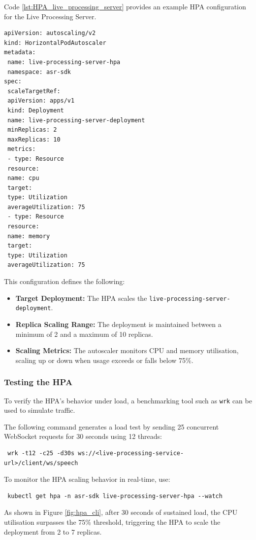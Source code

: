 Code \ref{lst:HPA_live_processing_server} provides an example HPA configuration for the Live Processing Server.


\begin{lstlisting}[language=Kubernetes, caption={Horizontal Pod Autoscaler for Live Processing Server}, label={lst:HPA_live_processing_server}]
apiVersion: autoscaling/v2
kind: HorizontalPodAutoscaler
metadata:
 name: live-processing-server-hpa
 namespace: asr-sdk
spec:
 scaleTargetRef:
 apiVersion: apps/v1
 kind: Deployment
 name: live-processing-server-deployment
 minReplicas: 2
 maxReplicas: 10
 metrics:
 - type: Resource
 resource:
 name: cpu
 target:
 type: Utilization
 averageUtilization: 75
 - type: Resource
 resource:
 name: memory
 target:
 type: Utilization
 averageUtilization: 75
\end{lstlisting}

This configuration defines the following:
\begin{itemize}
    \item \textbf{Target Deployment:} The HPA scales the \texttt{live-processing-server-deployment}.
    \item \textbf{Replica Scaling Range:} The deployment is maintained between a minimum of 2 and a maximum of 10 replicas.
    \item \textbf{Scaling Metrics:} The autoscaler monitors CPU and memory utilisation, scaling up or down when usage exceeds or falls below 75\%.
\end{itemize}
\subsubsection{Testing the HPA}
To verify the HPA's behavior under load, a benchmarking tool such as \texttt{wrk} can be used to simulate traffic.

The following command generates a load test by sending 25 concurrent WebSocket requests for 30 seconds using 12 threads:
\begin{verbatim}
 wrk -t12 -c25 -d30s ws://<live-processing-service-url>/client/ws/speech
\end{verbatim}

To monitor the HPA scaling behavior in real-time, use:
\begin{verbatim}
 kubectl get hpa -n asr-sdk live-processing-server-hpa --watch
\end{verbatim}

As shown in Figure \ref{fig:hpa_cli}, after 30 seconds of sustained load, the CPU utilisation surpasses the 75\% threshold, triggering the HPA to scale the deployment from 2 to 7 replicas.

